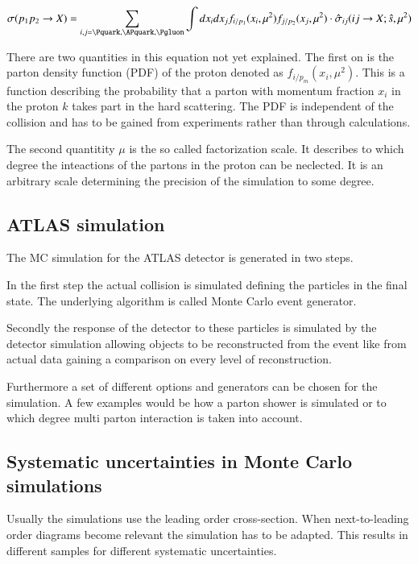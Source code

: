 \begin{align}
	\sigma ( p_1 p_2 \rightarrow X ) = \sum_{i,j = \Pquark, \APquark, \Pgluon} \int dx_i dx_j f_{i/p_1} ( x_i, \mu^2 ) f_{j/p_2} ( x_j, \mu^2 ) \cdot \hat{\sigma}_{ij} ( ij \rightarrow X; \hat{s}, \mu^2 )
\end{align}

There are two quantities in this equation not yet explained.
The first on is the parton density function (PDF) of the proton denoted as $f_{i/p_m} ( x_i, \mu^2 )$. This is a function describing the probability that a parton with momentum fraction $x_i$ in the proton $k$ takes part in the hard scattering. The PDF is independent of the collision and has to be gained from experiments rather than through calculations.

The second quantitity $\mu$ is the so called factorization scale. It describes to which degree the inteactions of the partons in the proton can be neclected. It is an arbitrary scale determining the precision of the simulation to some degree.

\subsection{ATLAS simulation}

The MC simulation for the ATLAS detector is generated in two steps.

In the first step the actual collision is simulated defining the particles in the final state. The underlying algorithm is called Monte Carlo event generator.

Secondly the response of the detector to these particles is simulated by the detector simulation allowing objects to be reconstructed from the event like from actual data gaining a comparison on every level of reconstruction.

Furthermore a set of different options and generators can be chosen for the simulation. A few examples would be how a parton shower is simulated or to which degree multi parton interaction is taken into account.

\subsection{Systematic uncertainties in Monte Carlo simulations}

Usually the simulations use the leading order cross-section.
When next-to-leading order diagrams become relevant the simulation has to be adapted. This results in different samples for different systematic uncertainties.

